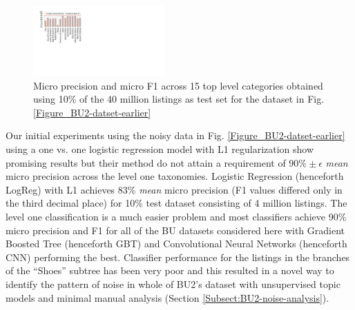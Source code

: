 \begin{figure}
	\centering
	\vspace{-0.6cm}
	\includegraphics[width=0.45\textwidth]{images/BU2-Dec2015-LogRegL1}
	\vspace{-0.7cm}
	\caption{{\small Micro precision and micro F1 across 15 top level categories obtained using 10\% of the 40 million listings as test set for the dataset in Fig. \ref{Figure_BU2-datset-earlier}}}
	\label{Figure_BU2-WUC-LogRegL1}
	\vspace{-0.5cm}
\end{figure} 
Our initial experiments using the noisy data in Fig. \ref{Figure_BU2-datset-earlier} using a one vs. one logistic regression model with L1 regularization \cite{Yu13:EBay,LibShortText} show promising results but their method do not attain a requirement of $90\% \pm \epsilon$  \textit{mean} micro precision across the level one taxonomies.
Logistic Regression (henceforth LogReg) with L1 achieves 83\% \textit{mean} micro precision (F1 values differed only in the third decimal place) for 10\% test dataset consisting of 4 million listings.
The level one classification is a much easier problem and most classifiers achieve 90\% micro precision and F1 for all of the BU datasets considered here with Gradient Boosted Tree (henceforth GBT) \cite{Friedman:GBT} and Convolutional Neural Networks (henceforth CNN) \cite{Kim14} performing the best. 
Classifier performance for the listings in the branches of the ``Shoes'' subtree has been very poor and this resulted in a novel way to identify the pattern of noise in whole of BU2's dataset with unsupervised topic models and minimal manual analysis (Section \ref{Subsect:BU2-noise-analysis}).


